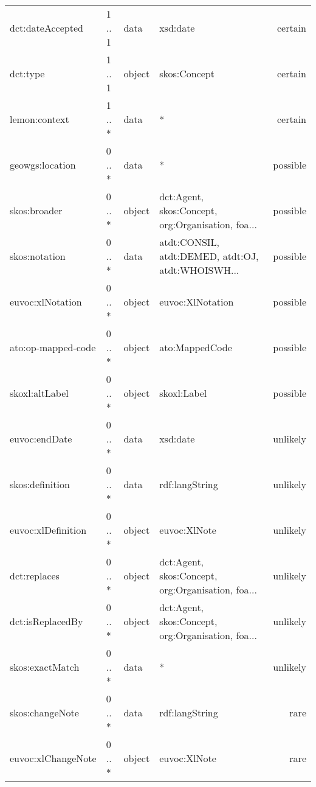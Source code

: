 \documentclass[10pt,a4paper,titlepage,final]{article}
\begin{document}
\begin{tabularx}{\textwidth}{lllXr}
       dct:dateAccepted &      1 .. 1 &    data &                                           xsd:date &    certain \\
               dct:type &      1 .. 1 &  object &                                       skos:Concept &    certain \\
          lemon:context &      1 .. * &    data &                                                  * &    certain \\
        geowgs:location &      0 .. * &    data &                                                  * &   possible \\
           skos:broader &      0 .. * &  object &  dct:Agent, skos:Concept, org:Organisation, foa... &   possible \\
          skos:notation &      0 .. * &    data &  atdt:CONSIL, atdt:DEMED, atdt:OJ, atdt:WHOISWH... &   possible \\
       euvoc:xlNotation &      0 .. * &  object &                                   euvoc:XlNotation &   possible \\
     ato:op-mapped-code &      0 .. * &  object &                                     ato:MappedCode &   possible \\
         skoxl:altLabel &      0 .. * &  object &                                        skoxl:Label &   possible \\
          euvoc:endDate &      0 .. * &    data &                                           xsd:date &   unlikely \\
        skos:definition &      0 .. * &    data &                                     rdf:langString &   unlikely \\
     euvoc:xlDefinition &      0 .. * &  object &                                       euvoc:XlNote &   unlikely \\
           dct:replaces &      0 .. * &  object &  dct:Agent, skos:Concept, org:Organisation, foa... &   unlikely \\
       dct:isReplacedBy &      0 .. * &  object &  dct:Agent, skos:Concept, org:Organisation, foa... &   unlikely \\
        skos:exactMatch &      0 .. * &    data &                                                  * &   unlikely \\
        skos:changeNote &      0 .. * &    data &                                     rdf:langString &       rare \\
     euvoc:xlChangeNote &      0 .. * &  object &                                       euvoc:XlNote &       rare \\

\end{tabularx}
\end{document}
